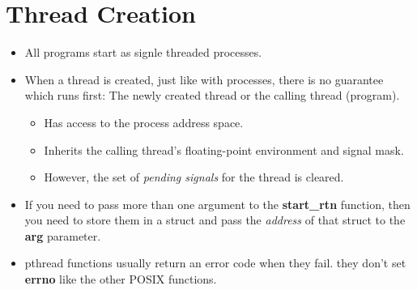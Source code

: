 \documentclass{article}
\begin{document}
\section{Thread Creation}
\begin{itemize}
    \item All programs start as signle threaded processes.

    \item When a thread is created, just like with processes, there is no guarantee which runs first: The newly created thread or the calling thread (program).
\begin{itemize}
    \item Has access to the process address space.
    \item Inherits the calling thread's floating-point environment and signal mask.
    \item However, the set of \emph{pending signals} for the thread is cleared.
\end{itemize}

\item If you need to pass more than one argument to the \textbf{start\_rtn} function,
then you need to store them in a struct and pass the \emph{address} of that struct
to the \textbf{arg} parameter.

\item pthread functions usually return an error code when they fail.
they don't set \textbf{errno} like the other POSIX functions.
\end{itemize}
\end{document}
